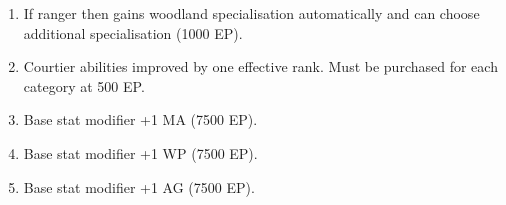 \documentclass[a4paper]{article}
\begin{document}
\begin{multicols*}{3}
\begin{enumerate}
\item If ranger then gains woodland specialisation automatically and
can choose additional specialisation (1000 EP).

\item Courtier abilities improved by one effective rank.  Must be
purchased for each category at 500 EP.

\item Base stat modifier +1 MA (7500 EP).

\item Base stat modifier +1 WP (7500 EP).

\item Base stat modifier +1 AG (7500 EP).

\end{enumerate}

\end{multicols*}
\end{document}
